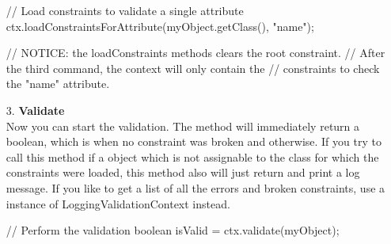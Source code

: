 \begin{itemize}
\begin{example}[style=java, title={Three different ways to load constraints}]
	// Load constraints to validate a single attribute
	ctx.loadConstraintsForAttribute(myObject.getClass(), "name");
	
	// NOTICE: the loadConstraints methods clears the root constraint.
	// After the third command, the context will only contain the 
	// constraints to check the "name" attribute.
\end{example}
\item[3.] \textbf{Validate} \\
Now you can start the validation. The method  will immediately return a boolean, which is  when no constraint was broken and  otherwise. If you try to call this method if a object which is not assignable to the class for which the constraints were loaded, this method also will just return  and print a log message. If you like to get a list of all the errors and broken constraints, use a instance of LoggingValidationContext instead.
\begin{example}[style=java, title={Validate}]
	// Perform the validation
	boolean isValid = ctx.validate(myObject);
\end{example}
\end{itemize}

